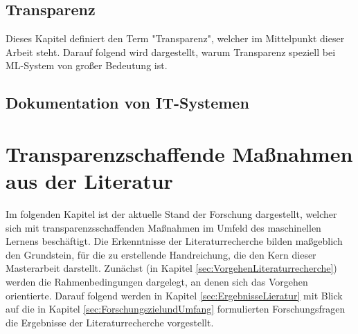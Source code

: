 \documentclass[
    fontsize=12pt,
    headings=small,
    twoside=false, %
    parskip=half,           %
    bibliography=totoc,
    numbers=noenddot,       %
    open=any,               %
    ]{scrreprt}
\begin{document}






\section{Transparenz}
Dieses Kapitel definiert den Term "Transparenz", welcher im Mittelpunkt dieser Arbeit steht. Darauf folgend wird dargestellt, warum Transparenz speziell bei ML-System von großer Bedeutung ist.



\section{Dokumentation von IT-Systemen}


\chapter{Transparenzschaffende Maßnahmen aus der Literatur}
Im folgenden Kapitel ist der aktuelle Stand der Forschung dargestellt, welcher sich mit transparenzsschaffenden Maßnahmen im Umfeld des maschinellen Lernens beschäftigt. Die Erkenntnisse der Literaturrecherche bilden maßgeblich den Grundstein, für die zu erstellende Handreichung, die den Kern dieser Masterarbeit darstellt. Zunächst (in Kapitel \ref{sec:VorgehenLiteraturrecherche}) werden die Rahmenbedingungen dargelegt, an denen sich das Vorgehen orientierte. Darauf folgend werden in Kapitel \ref{sec:ErgebnisseLieratur} mit Blick auf die in Kapitel \ref{sec:ForschungszielundUmfang} formulierten Forschungsfragen die Ergebnisse der Literaturrecherche vorgestellt.







\end{document}
